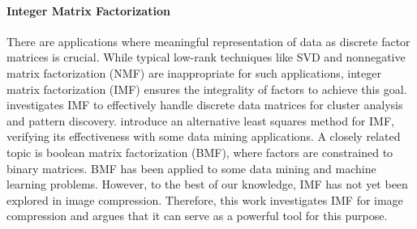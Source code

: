 \paragraph{Integer Matrix Factorization}
There are applications where meaningful representation of data as discrete factor matrices is crucial. While typical low-rank techniques like SVD and nonnegative matrix factorization (NMF) are inappropriate for such applications, integer matrix factorization (IMF) ensures the integrality of factors to achieve this goal. \textcite{lin2005integer} investigates IMF to effectively handle discrete data matrices for cluster analysis and pattern discovery. \textcite{dong2018integer} introduce an alternative least squares method for IMF, verifying its effectiveness with some data mining applications. A closely related topic is boolean matrix factorization (BMF), where factors are constrained to binary matrices. BMF has been applied to some data mining \cite{miettinen2008discrete} and machine learning \cite{ravanbakhsh2016boolean} problems. However, to the best of our knowledge, IMF has not yet been explored in image compression. Therefore, this work investigates IMF for image compression and argues that it can serve as a powerful tool for this purpose.
